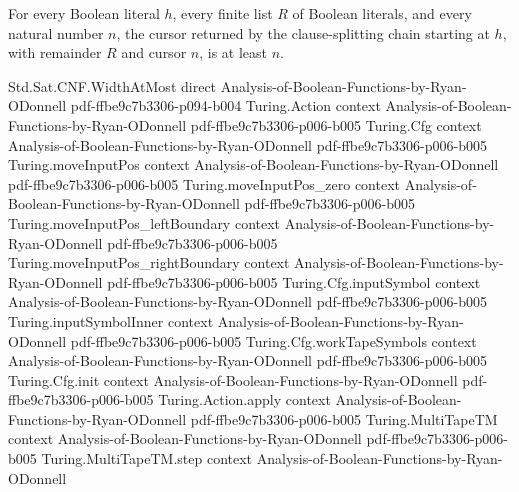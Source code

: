 \begin{lemma}
\label{Complexity.satChain_cursor}
\leanok
{}
For every Boolean literal $h$, every finite list $R$ of Boolean literals, and every
natural number $n$, the cursor returned by the clause-splitting chain starting at $h$,
with remainder $R$ and cursor $n$, is at least $n$.
\end{lemma}

\begin{lemma}
\label{Complexity.satChain_width}
\leanok
{}
\proofstep
  {Std.Sat.CNF.WidthAtMost}
  {direct}
  {Analysis-of-Boolean-Functions-by-Ryan-ODonnell}
  {pdf-ffbe9c7b3306-p094-b004}
\proofstep
  {Turing.Action}
  {context}
  {Analysis-of-Boolean-Functions-by-Ryan-ODonnell}
  {pdf-ffbe9c7b3306-p006-b005}
\proofstep
  {Turing.Cfg}
  {context}
  {Analysis-of-Boolean-Functions-by-Ryan-ODonnell}
  {pdf-ffbe9c7b3306-p006-b005}
\proofstep
  {Turing.moveInputPos}
  {context}
  {Analysis-of-Boolean-Functions-by-Ryan-ODonnell}
  {pdf-ffbe9c7b3306-p006-b005}
\proofstep
  {Turing.moveInputPos_zero}
  {context}
  {Analysis-of-Boolean-Functions-by-Ryan-ODonnell}
  {pdf-ffbe9c7b3306-p006-b005}
\proofstep
  {Turing.moveInputPos_leftBoundary}
  {context}
  {Analysis-of-Boolean-Functions-by-Ryan-ODonnell}
  {pdf-ffbe9c7b3306-p006-b005}
\proofstep
  {Turing.moveInputPos_rightBoundary}
  {context}
  {Analysis-of-Boolean-Functions-by-Ryan-ODonnell}
  {pdf-ffbe9c7b3306-p006-b005}
\proofstep
  {Turing.Cfg.inputSymbol}
  {context}
  {Analysis-of-Boolean-Functions-by-Ryan-ODonnell}
  {pdf-ffbe9c7b3306-p006-b005}
\proofstep
  {Turing.inputSymbolInner}
  {context}
  {Analysis-of-Boolean-Functions-by-Ryan-ODonnell}
  {pdf-ffbe9c7b3306-p006-b005}
\proofstep
  {Turing.Cfg.workTapeSymbols}
  {context}
  {Analysis-of-Boolean-Functions-by-Ryan-ODonnell}
  {pdf-ffbe9c7b3306-p006-b005}
\proofstep
  {Turing.Cfg.init}
  {context}
  {Analysis-of-Boolean-Functions-by-Ryan-ODonnell}
  {pdf-ffbe9c7b3306-p006-b005}
\proofstep
  {Turing.Action.apply}
  {context}
  {Analysis-of-Boolean-Functions-by-Ryan-ODonnell}
  {pdf-ffbe9c7b3306-p006-b005}
\proofstep
  {Turing.MultiTapeTM}
  {context}
  {Analysis-of-Boolean-Functions-by-Ryan-ODonnell}
  {pdf-ffbe9c7b3306-p006-b005}
\proofstep
  {Turing.MultiTapeTM.step}
  {context}
  {Analysis-of-Boolean-Functions-by-Ryan-ODonnell}

\end{lemma}
